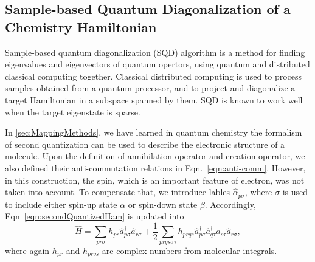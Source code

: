 \subsection{Sample-based Quantum Diagonalization of a Chemistry Hamiltonian}
Sample-based quantum diagonalization (SQD) algorithm \cite{Robledo_Moreno_2025, ibm2024sqd} is a method for finding eigenvalues and eigenvectors of quantum opertors, using quantum and distributed classical computing together. Classical distributed computing is used to process samples obtained from a quantum processor, and to project and diagonalize a target Hamiltonian in a subspace spanned by them. SQD is known to work well when the target eigenstate is sparse.

In \ref{sec:MappingMethods}, we have learned in quantum chemistry the formalism of second quantization can be used to describe the electronic structure of a molecule. Upon the definition of annihilation operator and creation operator, we also defined their anti-commutation relations in Eqn.~\ref{eqn:anti-comm}. However, in this construction, the spin, which is an important feature of electron, was not taken into account. To compensate that, we introduce lables $\hat{\alpha}_{p\sigma}$, where $\sigma$ is used to include either spin-up state $\alpha$ or spin-down state $\beta$. Accordingly, Eqn~\ref{eqn:secondQuantizedHam} is updated into
\begin{equation}
    \hat{H}=\sum_{pr\sigma}h_{pr}\hat{a}^{\dagger}_{p\sigma}\hat{a}_{r\sigma}+\frac{1}{2}\sum_{prqs\sigma\tau}h_{prqs}\hat{a}^{\dagger}_{p\sigma}\hat{a}^{\dagger}_{q\tau}\hat{a}_{s\tau}\hat{a}_{r\sigma},
\end{equation}
where again $h_{pr}$ and $h_{prqs}$ are complex numbers from molecular integrals.

